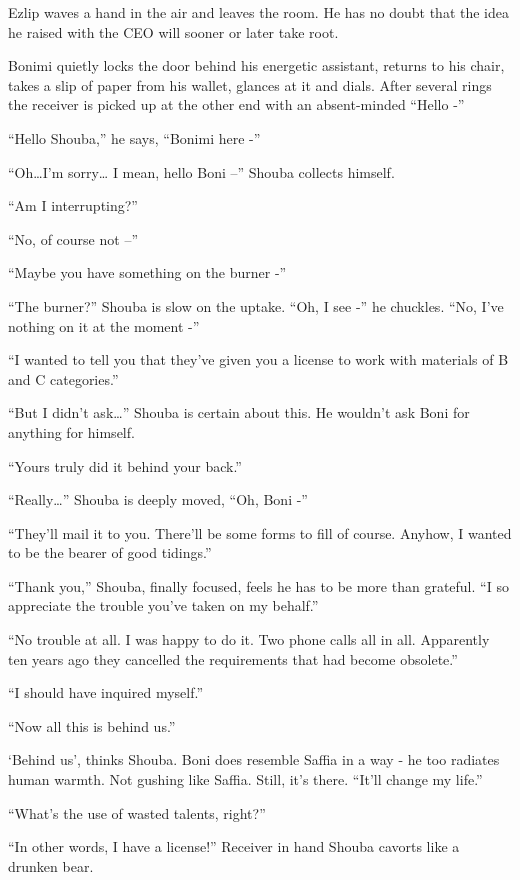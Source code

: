 \documentclass[twoside,11pt]{book}
\begin{document}
Ezlip waves a hand in the air and leaves the room. He has no doubt that the idea he raised with the CEO will sooner or
later take root.

Bonimi quietly locks the door behind his energetic assistant, returns to his chair, takes a slip of paper from his
wallet, glances at it and dials.  After several rings the receiver is picked up at the other end with an absent-minded
``Hello -''

``Hello Shouba,'' he says, ``Bonimi here -''

``Oh{\ldots}I'm sorry{\dots} I mean, hello Boni --'' Shouba collects himself.

``Am I interrupting?''

``No, of course not --''

``Maybe you have something on the burner -''

``The burner?'' Shouba is slow on the uptake.  ``Oh, I see -'' he
chuckles. ``No, I've nothing on it at the moment -''

``I wanted to tell you that they've given you a license to work with materials of B and C
categories.''

``But I didn't ask{\dots}'' Shouba is certain about this. He wouldn't ask Boni for anything
for himself.

``Yours truly did it behind your back.''

``Really{\dots}'' Shouba is deeply moved, ``Oh,  Boni -''

``They'll mail it to you. There'll be some forms to fill of course. Anyhow, I wanted to be the bearer of
good tidings.''

``Thank you,'' Shouba, finally focused, feels he has to be more than grateful.
``I so appreciate the trouble you've taken on my behalf.''

``No trouble at all. I was happy to do it. Two phone calls all in all. Apparently ten years ago they
cancelled the requirements that had become obsolete.''

``I should have inquired myself.''

``Now all this is behind us.''

`Behind us', thinks Shouba. Boni does resemble Saffia in a way - he too radiates human warmth. Not gushing like
Saffia. Still, it's there. ``It'll change my life.''

``What's the use of wasted talents, right?''

``In other words, I have a license!'' Receiver in hand Shouba cavorts like a drunken bear.
\end{document}
